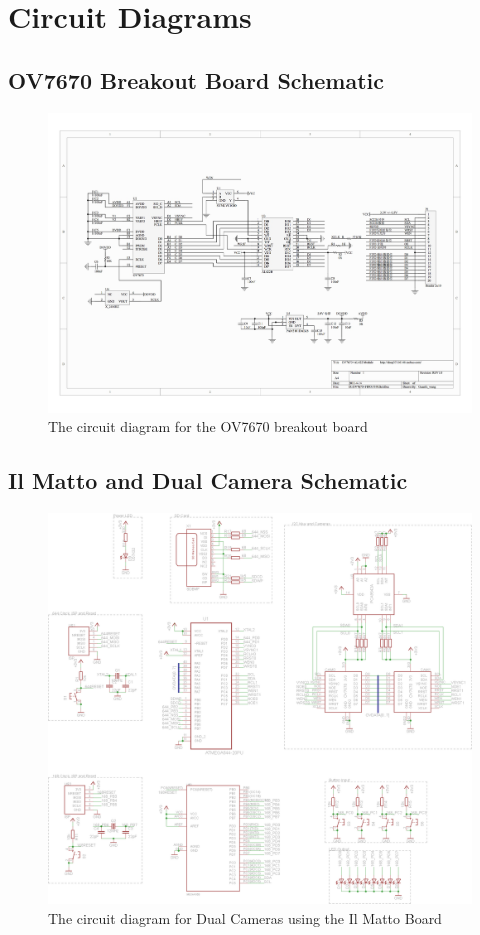\chapter{Circuit Diagrams} \label{Chapter:AppendixA:CircuitDiagrams}
\section{OV7670 Breakout Board Schematic}
\begin{figure}
\includegraphics[width=\textwidth,height=\textheight,keepaspectratio]{Figures/OV7670_Schematic.jpg} 
\caption{The circuit diagram for the OV7670 breakout board}
\label{OV7670_Schematic}

\end{figure}

\section{Il Matto and Dual Camera Schematic}
\begin{figure}
\includegraphics[angle = 90, width=\textwidth,height=\textheight,keepaspectratio]{Figures/IlMattoCamera_CircuitDiagram.png} 
\caption{The circuit diagram for Dual Cameras using the Il Matto Board}
\label{DualCam_Schematic}

\end{figure}